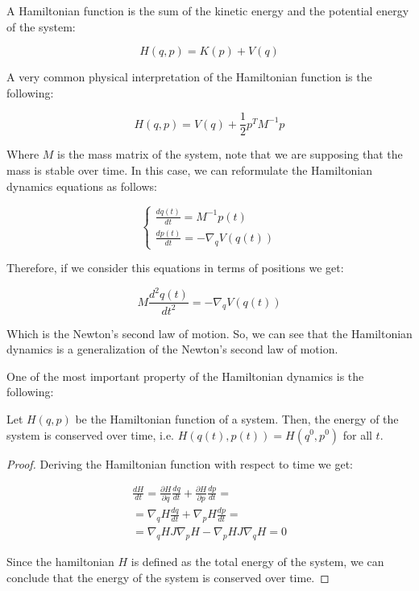\documentclass{article}
\begin{document}
A Hamiltonian function is the sum of the kinetic energy and the potential energy of the system:

\begin{equation*}
	H(q,p) = K(p) + V(q)
\end{equation*}

A very common physical interpretation of the Hamiltonian function is the following:

\begin{equation*}
	H(q,p) = V(q) + \frac{1}{2} p^T M^{-1} p
\end{equation*}

Where \(M\) is the mass matrix of the system, note that we are supposing that the mass is stable over time. In this case, we can reformulate the Hamiltonian dynamics equations as follows:

\begin{equation} 
	\begin{cases}
		\frac{dq(t)}{dt} = M^{-1} p(t) \\
		\frac{dp(t)}{dt} = -\nabla_q V(q(t))
	\end{cases}
	\label{eq:hamiltoniandynamics3}
\end{equation}

Therefore, if we consider this equations in terms of positions we get:

\begin{equation*} 
	M\frac{d^2q(t)}{dt^2} = -\nabla_q V(q(t))
\end{equation*}

Which is the Newton's second law of motion. So, we can see that the Hamiltonian dynamics is a generalization of the Newton's second law of motion.

One of the most important property of the Hamiltonian dynamics is the following:

\begin{theorem}
	Let \(H(q,p)\) be the Hamiltonian function of a system. Then, the energy of the system is conserved over time, i.e. \(H(q(t),p(t)) = H(q^0,p^0)\) for all \(t\).
\end{theorem}

\begin{proof}
	Deriving the Hamiltonian function with respect to time we get:

	\begin{gather*}
		\frac{dH}{dt} = \frac{\partial H}{\partial q} \frac{dq}{dt} + \frac{\partial H}{\partial p} \frac{dp}{dt} = \\ 
		= \nabla_q H \frac{dq}{dt} + \nabla_p H \frac{dp}{dt} = \\ 
		= \nabla_q H J \nabla_p H - \nabla_p H J \nabla_q H = 0
	\end{gather*}

	Since the hamiltonian \(H\) is defined as the total energy of the system, we can conclude that the energy of the system is conserved over time.
\end{proof}
\end{document}
